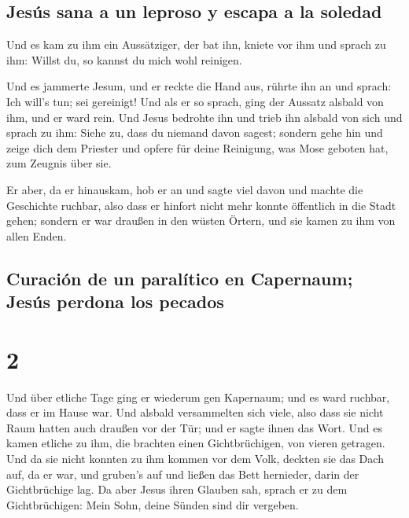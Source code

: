 \hypertarget{jesuxfas-sana-a-un-leproso-y-escapa-a-la-soledad}{%
\subsection{Jesús sana a un leproso y escapa a la
soledad}\label{jesuxfas-sana-a-un-leproso-y-escapa-a-la-soledad}}

 Und es kam zu ihm ein Aussätziger, der bat ihn, kniete
vor ihm und sprach zu ihm: Willst du, so kannst du mich wohl reinigen.

 Und es jammerte Jesum, und er reckte die Hand aus,
rührte ihn an und sprach: Ich will's tun; sei gereinigt! 
Und als er so sprach, ging der Aussatz alsbald von ihm, und er ward
rein.  Und Jesus bedrohte ihn und trieb ihn alsbald von
sich  und sprach zu ihm: Siehe zu, dass du niemand davon
sagest; sondern gehe hin und zeige dich dem Priester und opfere für
deine Reinigung, was Mose geboten hat, zum Zeugnis über sie.

 Er aber, da er hinauskam, hob er an und sagte viel davon
und machte die Geschichte ruchbar, also dass er hinfort nicht mehr
konnte öffentlich in die Stadt gehen; sondern er war draußen in den
wüsten Örtern, und sie kamen zu ihm von allen Enden.

\hypertarget{curaciuxf3n-de-un-paraluxedtico-en-capernaum-jesuxfas-perdona-los-pecados}{%
\subsection{Curación de un paralítico en Capernaum; Jesús perdona los
pecados}\label{curaciuxf3n-de-un-paraluxedtico-en-capernaum-jesuxfas-perdona-los-pecados}}

\hypertarget{section-1}{%
\section{2}\label{section-1}}

 Und über etliche Tage ging er wiederum gen Kapernaum; und
es ward ruchbar, dass er im Hause war.  Und alsbald
versammelten sich viele, also dass sie nicht Raum hatten auch draußen
vor der Tür; und er sagte ihnen das Wort.  Und es kamen
etliche zu ihm, die brachten einen Gichtbrüchigen, von vieren getragen.
 Und da sie nicht konnten zu ihm kommen vor dem Volk,
deckten sie das Dach auf, da er war, und gruben's auf und ließen das
Bett hernieder, darin der Gichtbrüchige lag.  Da aber
Jesus ihren Glauben sah, sprach er zu dem Gichtbrüchigen: Mein Sohn,
deine Sünden sind dir vergeben.

